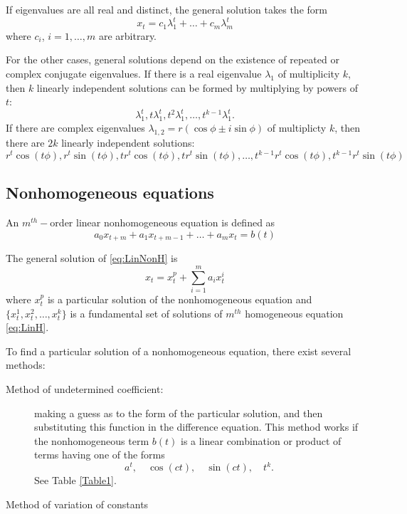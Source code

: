 If eigenvalues are all real and distinct, the general solution takes the form
$$x_t=c_1\lambda_1^t+\dots +c_m\lambda_m^t$$
where $c_i$, $i=1,\dots ,m$ are arbitrary.

For the other cases, general solutions depend on the existence of repeated or complex conjugate eigenvalues. If there is a real eigenvalue $\lambda _1$ of multiplicity $k$, then $k$ linearly independent solutions can be formed by multiplying by powers of $t$:
$$\lambda_1 ^t, t \lambda_1 ^t, t^2\lambda_1 ^t, \dots , t^{k-1}\lambda_1 ^t.$$
If there are complex eigenvalues $\lambda _{1,2}=r(\cos \phi \pm i \sin \phi)$ of multiplicty $k$, then there are $2k$ linearly independent solutions:
$$r^t\cos(t\phi),r^t\sin (t\phi),tr^t\cos(t\phi),tr^t\sin (t\phi),\dots,t^{k-1}r^t\cos(t\phi),t^{k-1}r^t\sin (t\phi)$$




\subsection{Nonhomogeneous equations}
An $m^{th}-$order linear nonhomogeneous equation  is defined as
\begin{equation}\label{eq:LinNonH}
a_0x_{t+m}+a_1x_{t+m-1}+\dots + a_m x_{t}=b(t)
\end{equation}

\begin{theorem}
The general solution of \eqref{eq:LinNonH} is
$$x_t=x_t^p+\sum_{i=1}^m a_i x_t^i$$
where $x_t^p$ is a particular solution of the nonhomogeneous equation and $\{x_t^1, x_t^2,\dots, x_t^k\}$ is a fundamental set of solutions of $m^{th}$ homogeneous equation \eqref{eq:LinH}.
\end{theorem}


To find a particular solution of a nonhomogeneous equation, there exist several methods:
\begin{description}
\item[Method of undetermined coefficient:] making a guess as to the form of the particular solution, and then substituting this function in the difference equation. This method works if the nonhomogeneous term $b(t)$ is a linear combination or product of terms having one of the forms
$$a^t, \quad \cos(ct), \quad  \sin(ct), \quad t^k.$$
See Table \ref{Table1}.
\item[Method of variation of constants]
\end{description}

